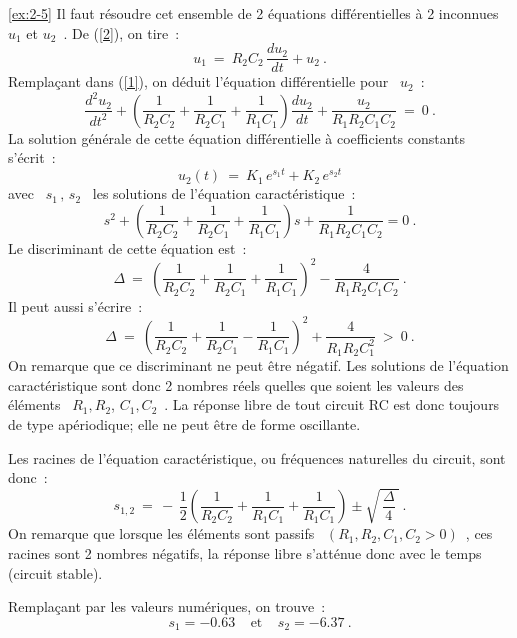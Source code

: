 \begin{solexercise}{\ref{ex:2-5}}
Il faut r\'esoudre cet ensemble de 2 \'equations diff\'erentielles \`a 2
inconnues \ $u_1$ et $u_2$~.
De (\ref{2}), on tire~:
\begin{equation}
u_1 \: = \: R_2C_2 \, \dfrac{du_2}{dt} + u_2~.\label{3}
\end{equation}
Rempla\c{c}ant dans (\ref{1}), on d\'eduit l'\'equation diff\'erentielle
pour \ $u_2$~:
\[ \dfrac{d^2u_2}{dt^2} + \left( \dfrac{1}{R_2C_2} + \dfrac{1}{R_2C_1} 
+ \dfrac{1}{R_1C_1} \right) \dfrac{du_2}{dt} +
\dfrac{u_2}{R_1R_2C_1C_2} \: = \: 0~. \] La solution g\'en\'erale de cette
\'equation diff\'erentielle \`a coefficients constants s'\'ecrit~:
\[ u_2(t) \: = \: K_1\, e^{s_1t} + K_2\, e^{s_2t} \]
avec \ $s_1\, , \, s_2$ \ les solutions de l'\'equation caract\'eristique~:
\[ s^2 + \left( \dfrac{1}{R_2C_2} + \dfrac{1}{R_2C_1} + \dfrac{1}{R_1C_1} \right) s
+ \frac{1}{R_1R_2C_1C_2}=0~. \]
Le discriminant de cette \'equation est~:
\[  \Delta \: = \: \left( \dfrac{1}{R_2C_2} + \dfrac{1}{R_2C_1} 
+ \dfrac{1}{R_1C_1} \right)^2 - \dfrac{4}{R_1R_2C_1C_2}~. \]
Il peut aussi s'\'ecrire~:
\[  \Delta \: = \: \left( \dfrac{1}{R_2C_2} + \dfrac{1}{R_2C_1} 
- \dfrac{1}{R_1C_1} \right)^2 + \dfrac{4}{R_1R_2C_1^2}\: > \ 0~. \] On
remarque que ce discriminant ne peut \^etre n\'egatif. Les solutions de
l'\'equation caract\'eristique sont donc 2 nombres r\'eels quelles que
soient les valeurs des \'el\'ements \ $R_1,R_2$, $C_1,C_2$~. La r\'eponse libre
de tout circuit RC est donc toujours de type ap\'eriodique; elle ne peut
\^etre de forme oscillante.

Les racines de l'\'equation caract\'eristique, ou fr\'equences naturelles du
circuit, sont donc~:
\[ s_{1,2} \: = \, -\, \dfrac{1}{2} \left( \dfrac{1}{R_2C_2} + \dfrac{1}{R_1C_1} 
+ \dfrac{1}{R_1C_1} \right) \pm \sqrt{\,\dfrac{\Delta}{4}~}~. \] On
remarque que lorsque les \'el\'ements sont passifs \ $(R_1,R_2,C_1,C_2 >
0)$~, ces racines sont 2 nombres n\'egatifs, la r\'eponse libre s'att\'enue
donc avec le temps (circuit stable).

Rempla\c{c}ant par les valeurs num\'eriques, on trouve~:
\[ s_1 = -0.63~~~~~\mbox{et}~~~~~s_2 = -6.37~.\]


\end{solexercise}
